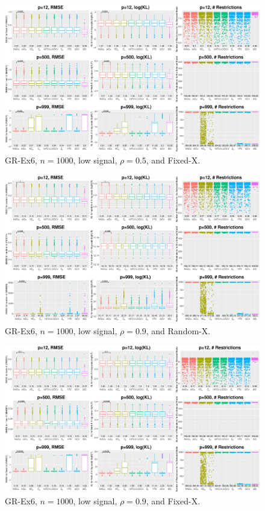 \begin{figure}[!ht]
\centering
\includegraphics[width=\textwidth]{figures/supplement/fixedx_GR-Ex6_n1000_lsnr_rho05.eps}
\caption{GR-Ex6, $n=1000$, low signal, $\rho=0.5$, and Fixed-X.}
\end{figure}
\clearpage
\begin{figure}[!ht]
\centering
\includegraphics[width=\textwidth]{figures/supplement/randomx_GR-Ex6_n1000_lsnr_rho09.eps}
\caption{GR-Ex6, $n=1000$, low signal, $\rho=0.9$, and Random-X.}
\end{figure}
\begin{figure}[!ht]
\centering
\includegraphics[width=\textwidth]{figures/supplement/fixedx_GR-Ex6_n1000_lsnr_rho09.eps}
\caption{GR-Ex6, $n=1000$, low signal, $\rho=0.9$, and Fixed-X.}
\end{figure}
\clearpage

